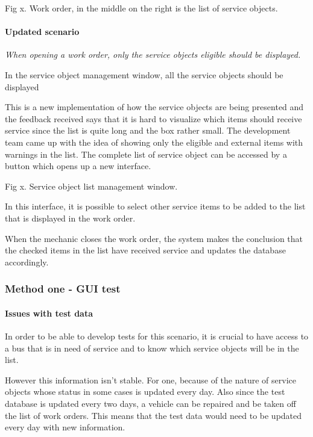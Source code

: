 \documentclass{article}
\begin{document}
			Fig x. Work order, in the middle on the right is the list of service objects.

			\paragraph{Updated scenario}
			{\em When opening a work order, only the service objects eligible should be displayed.}

			In the service object management window, all the service objects should be displayed
			
			This is a new implementation of how the service objects are being presented and the feedback received says that it is hard to visualize which items should receive service since the list is quite long and the box rather small. The development team came up with the idea of showing only the eligible and external items with warnings in the list. The complete list of service object can be accessed by a button which opens up a new interface.

			Fig x. Service object list management window.

			In this interface, it is possible to select other service items to be added to the list that is displayed in the work order.

			When the mechanic closes the work order, the system makes the conclusion that the checked items in the list have received service and updates the database accordingly.


			\subsubsection{Method one - GUI test}


				\paragraph{Issues with test data}
				
				In order to be able to develop tests for this scenario, it is crucial to have access to a bus that is in need of service and to know which service objects will be in the list. 

				However this information isn’t stable. For one, because of the nature of service objects whose status in some cases is updated every day. Also since the test database is updated every two days, a vehicle can be repaired and be taken off the list of work orders. This means that the test data would need to be updated every day with new information.
\end{document}

